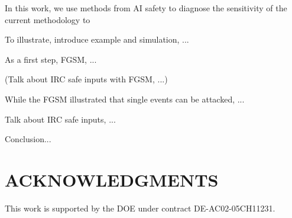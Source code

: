 \documentclass[reprint,nofootinbib,...]{revtex4-1}
\begin{document}
In this work, we use methods from AI safety to diagnose the sensitivity of the current methodology to 

To illustrate, introduce example and simulation, ...

As a first step, FGSM, ...

(Talk about IRC safe inputs with FGSM, ...)

While the FGSM illustrated that single events can be attacked, ...

Talk about IRC safe inputs, ...

Conclusion...


\section*{ACKNOWLEDGMENTS}

This work is supported by the DOE under contract DE-AC02-05CH11231. 


\end{document}
